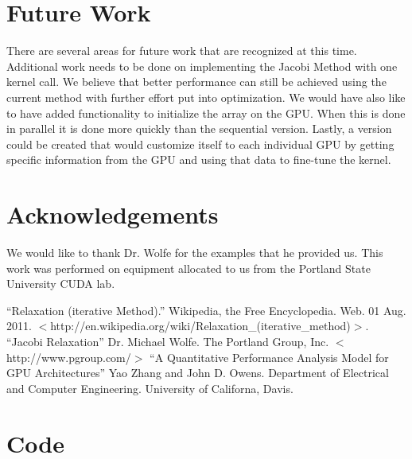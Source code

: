 \documentclass[10pt]{article}
\begin{document}
\begin{multicols}{2}
  \section{Future Work} %
  \label{sec:future_work}
  There are several areas for future work that are recognized at this time.
  Additional work needs to be done on implementing the Jacobi Method with one kernel call.
  We believe that better performance can still be achieved using the current method with further effort put into optimization.
  We would have also like to have added functionality to initialize the array on the GPU.
  When this is done in parallel it is done more quickly than the sequential version.
  Lastly, a version could be created that would customize itself to each individual GPU by getting specific information from the GPU and using that data to fine-tune the kernel.

  \section{Acknowledgements} %
  \label{sec:acknowledgements}
  We would like to thank Dr. Wolfe for the examples that he provided us.
  This work was performed on equipment allocated to us from the Portland State University CUDA lab.

\end{multicols}

\begin{flushleft}
  \begin{thebibliography}{99}
    ``Relaxation (iterative Method).''
      Wikipedia, the Free Encyclopedia. Web. 01 Aug. 2011. $<$http://en.wikipedia.org/wiki/Relaxation\_(iterative\_method)$>$.
    ``Jacobi Relaxation''
      Dr. Michael Wolfe. The Portland Group, Inc. $<$http://www.pgroup.com/$>$
    ``A Quantitative Performance Analysis Model for GPU Architectures''
      Yao Zhang and John D. Owens. Department of Electrical and Computer Engineering. University of Californa, Davis.
  \end{thebibliography}
\end{flushleft}

\clearpage

\appendix
\section{Code}
\label{sec:code}
\end{document}
